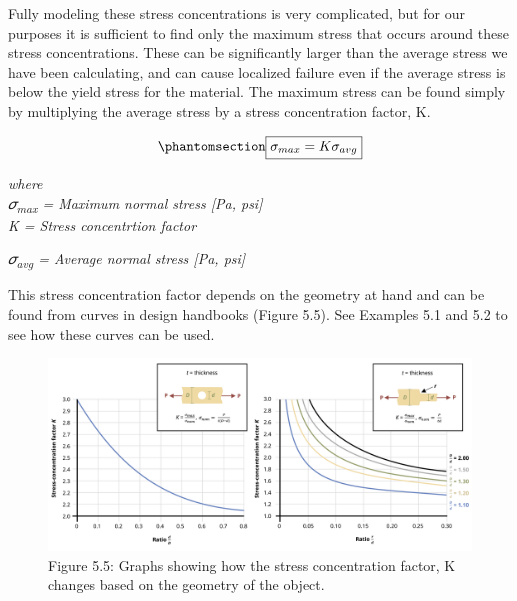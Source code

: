 \documentclass[
  letterpaper,
  DIV=11,
  numbers=noendperiod]{scrreprt}
\theoremstyle{definition}
\theoremstyle{remark}
\begin{document}
Fully modeling these stress concentrations is very complicated, but for
our purposes it is sufficient to find only the maximum stress that
occurs around these stress concentrations. These can be significantly
larger than the average stress we have been calculating, and can cause
localized failure even if the average stress is below the yield stress
for the material. The maximum stress can be found simply by multiplying
the average stress by a stress concentration factor, K.

\begin{equation}\phantomsection\label{eq-5.1}{
\boxed{\sigma_{max}=K \sigma_{avg}}}\end{equation}

\emph{where}\\
\emph{𝜎\textsubscript{max} = Maximum normal stress {[}Pa, psi{]}}\\
\emph{K = Stress concentrtion factor}

\emph{𝜎\textsubscript{avg} = Average normal stress {[}Pa, psi{]}}

This stress concentration factor depends on the geometry at hand and can
be found from curves in design handbooks (Figure 5.5). See Examples 5.1
and 5.2 to see how these curves can be used.

\begin{figure}[H]

{\centering \includegraphics{images/PNGs/Figure 5.5.png}

}

\caption{Figure 5.5: Graphs showing how the stress concentration factor,
K changes based on the geometry of the object.}

\end{figure}%
\end{document}
